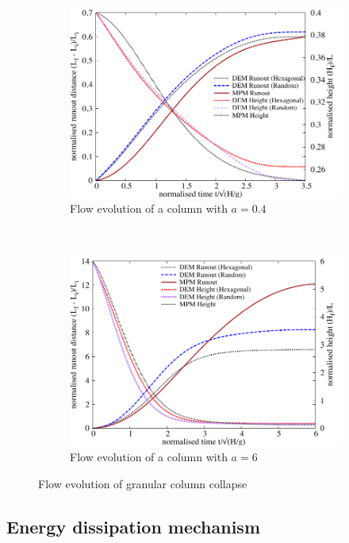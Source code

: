 \begin{figure}[tbhp]
\centering
\begin{subfigure}[b]{0.975\textwidth}
\centering
\includegraphics[width=\textwidth]{flowa04}
\caption{Flow evolution of a column with $a=0.4$}
\label{fig:flowa04}
\end{subfigure}
\\
\begin{subfigure}[b]{0.975\textwidth}
\centering
\includegraphics[width=\textwidth]{flowa6}
\caption{Flow evolution of a column with $a=6$}
\label{fig:flowa6}
\end{subfigure}
\caption{Flow evolution of granular column collapse}
\label{fig:flow_column}
\end{figure}

\subsection{Energy dissipation mechanism}
\label{sec:energy}

